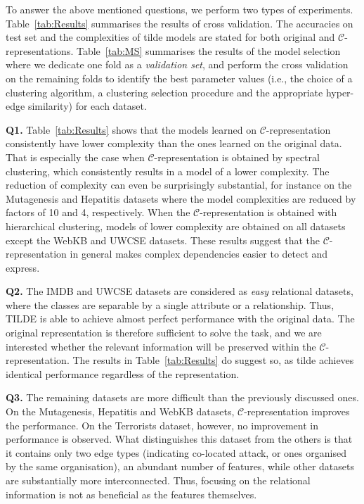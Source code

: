 To answer the above mentioned questions, we perform two types of experiments.
Table~\ref{tab:Results} summarises the results of cross validation.
The accuracies on test set and the complexities of \gls{tilde} models are stated for both original and $\mathcal{C}$-representations.
Table~\ref{tab:MS} summarises the results of the model selection where we dedicate one fold as a \textit{validation set}, and perform the cross validation on the remaining folds to identify the best parameter values (i.e., the choice of a clustering algorithm, a clustering selection procedure and the appropriate hyper-edge similarity) for each dataset.

\textbf{Q1.}
Table~\ref{tab:Results} shows that the models learned on $\mathcal{C}$-representation consistently have lower complexity than the ones learned on the original data.
That is especially the case when $\mathcal{C}$-representation is obtained by spectral clustering, which consistently results in a model of a lower complexity.
The reduction of complexity can even be surprisingly substantial, for instance on the Mutagenesis and Hepatitis datasets where the model complexities are reduced by factors of 10 and 4, respectively.
When the $\mathcal{C}$-representation is obtained with hierarchical clustering, models of lower complexity are obtained on all datasets except the WebKB and UWCSE datasets.
These results suggest that the $\mathcal{C}$-representation in general makes complex dependencies easier to detect and express.




\textbf{Q2.}
The IMDB and UWCSE datasets are considered as \textit{easy} relational datasets, where the classes are separable by a single attribute or a relationship.
Thus, TILDE is able to achieve almost perfect performance  with the original data.
The original representation is therefore sufficient to solve the task, and we are interested whether  the relevant information will be preserved within the $\mathcal{C}$-representation.
The results in Table~\ref{tab:Results} do suggest so, as \gls{tilde} achieves identical performance regardless of the representation.



\textbf{Q3.}
The remaining datasets are more difficult than the previously discussed ones.
On the Mutagenesis, Hepatitis and WebKB datasets, $\mathcal{C}$-representation improves the performance.
On the Terrorists dataset, however, no improvement in performance is observed.
What distinguishes this dataset from the others is that it contains only two edge types (indicating co-located attack, or ones organised by the same organisation), an abundant number of features, while other datasets are substantially more interconnected.
Thus, focusing on the relational information is not as beneficial as the features themselves.

